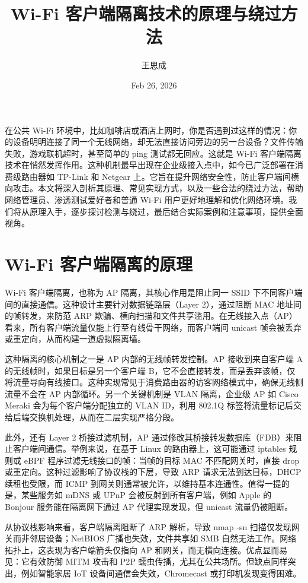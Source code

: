 \title{Wi-Fi 客户端隔离技术的原理与绕过方法}
\author{王思成}
\date{Feb 26, 2026}
\maketitle
在公共 Wi-Fi 环境中，比如咖啡店或酒店上网时，你是否遇到过这样的情况：你的设备明明连接了同一个无线网络，却无法直接访问旁边的另一台设备？文件传输失败，游戏联机超时，甚至简单的 ping 测试都无回应。这就是 Wi-Fi 客户端隔离技术在悄然发挥作用。这种机制最早出现在企业级接入点中，如今已广泛部署在消费级路由器如 TP-Link 和 Netgear 上。它旨在提升网络安全性，防止客户端间横向攻击。本文将深入剖析其原理、常见实现方式，以及一些合法的绕过方法，帮助网络管理员、渗透测试爱好者和普通 Wi-Fi 用户更好地理解和优化网络环境。我们将从原理入手，逐步探讨检测与绕过，最后结合实际案例和注意事项，提供全面视角。\par
\chapter{Wi-Fi 客户端隔离的原理}
Wi-Fi 客户端隔离，也称为 AP 隔离，其核心作用是阻止同一 SSID 下不同客户端间的直接通信。这种设计主要针对数据链路层（Layer 2），通过阻断 MAC 地址间的帧转发，来防范 ARP 欺骗、横向扫描和文件共享滥用。在无线接入点（AP）看来，所有客户端流量仅能上行至有线骨干网络，而客户端间 unicast 帧会被丢弃或重定向，从而构建一道虚拟隔离墙。\par
这种隔离的核心机制之一是 AP 内部的无线帧转发控制。AP 接收到来自客户端 A 的无线帧时，如果目标是另一个客户端 B，它不会直接转发，而是丢弃该帧，仅将流量导向有线接口。这种实现常见于消费路由器的访客网络模式中，确保无线侧流量不会在 AP 内部循环。另一个关键机制是 VLAN 隔离，企业级 AP 如 Cisco Meraki 会为每个客户端分配独立的 VLAN ID，利用 802.1Q 标签将流量标记后交给后端交换机处理，从而在二层实现严格分段。\par
此外，还有 Layer 2 桥接过滤机制，AP 通过修改其桥接转发数据库（FDB）来阻止客户端间通信。举例来说，在基于 Linux 的路由器上，这可能通过 iptables 规则或 eBPF 程序过滤无线接口的帧：当帧的目标 MAC 不匹配网关时，直接 drop 或重定向。这种过滤影响了协议栈的下层，导致 ARP 请求无法到达目标，DHCP 续租也受限，而 ICMP 到网关则通常被允许，以维持基本连通性。值得一提的是，某些服务如 mDNS 或 UPnP 会被反射到所有客户端，例如 Apple 的 Bonjour 服务能在隔离网下通过 AP 代理实现发现，但 unicast 流量仍被阻断。\par
从协议栈影响来看，客户端隔离阻断了 ARP 解析，导致 nmap -sn 扫描仅发现网关而非邻居设备；NetBIOS 广播也失效，文件共享如 SMB 自然无法工作。网络拓扑上，这表现为客户端箭头仅指向 AP 和网关，而无横向连接。优点显而易见：它有效防御 MITM 攻击和 P2P 蠕虫传播，尤其在公共场所。但缺点同样突出，例如智能家居 IoT 设备间通信会失效，Chromecast 或打印机发现变得困难。\par
